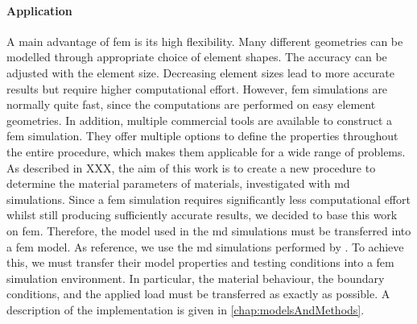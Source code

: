 \paragraph{Application}
A main advantage of \acrshort{fem} is its high flexibility. Many different geometries can be modelled through appropriate choice of element shapes. The accuracy can be adjusted with the element size. Decreasing element sizes lead to more accurate results but require higher computational effort. However, \acrshort{fem} simulations are normally quite fast, since the computations are performed on easy element geometries. In addition, multiple commercial tools are available to construct a \acrshort{fem} simulation. They offer multiple options to define the properties throughout the entire procedure, which makes them applicable for a wide range of problems. \\
As described in XXX, the aim of this work is to create a new procedure to determine the material parameters of materials, investigated with \acrshort{md} simulations. Since a \acrshort{fem} simulation requires significantly less computational effort whilst still producing sufficiently accurate results, we decided to base this work on \acrshort{fem}. Therefore, the model used in the \acrshort{md} simulations must be transferred into a \acrshort{fem} model. As reference, we use the \acrshort{md} simulations performed by \citet{ries_deciphering_nodate}. To achieve this, we must transfer their model properties and testing conditions into a \acrshort{fem} simulation environment. In particular, the material behaviour, the boundary conditions, and the applied load must be transferred as exactly as possible. A description of the implementation is given in \autoref{chap:modelsAndMethods}.







